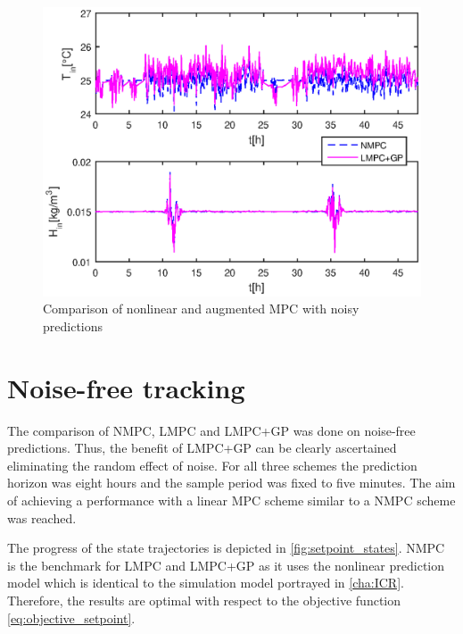 \begin{figure}[!t]
\begin{center}
		\includegraphics[width=\textwidth]{../Figures/setpoint_noise.eps}
		\caption{Comparison of nonlinear and augmented MPC with noisy predictions}
		\label{fig:noisy_mpc}
\end{center}
\end{figure}

\section{Noise-free tracking}
\label{sec:noisefree}

The comparison of NMPC, LMPC and LMPC+GP was done on noise-free predictions.
Thus, the benefit of LMPC+GP can be clearly ascertained eliminating the random effect of noise.
For all three schemes the prediction horizon was eight hours and the sample period was fixed to five minutes.
The aim of achieving a performance with a linear MPC scheme similar to a NMPC scheme was reached.

The progress of the state trajectories is depicted in \cref{fig:setpoint_states}.
NMPC is the benchmark for LMPC and LMPC+GP as it uses the nonlinear prediction model which is identical to the simulation model portrayed in \cref{cha:ICR}.
Therefore, the results are optimal with respect to the objective function \eqref{eq:objective_setpoint}.

